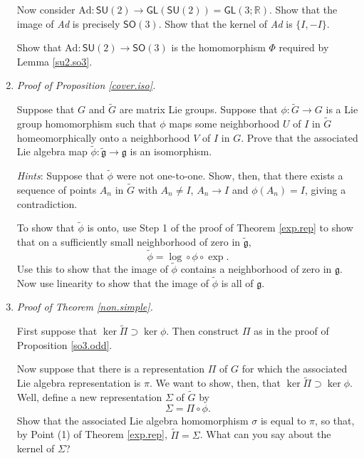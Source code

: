 \documentclass[12pt]{amsbook}
\let \frak = \mathfrak
\theoremstyle{plain}
\numberwithin{equation}{chapter}
\numberwithin{theorem}{chapter}
\begin{document}
\begin{enumerate}
Now consider $\mathrm{Ad}:\mathsf{SU}(2)\rightarrow\mathsf{GL}\left(
\mathsf{SU}(2)\right)  =\mathsf{GL}\left(  3;\mathbb{R}\right)  $. Show that
the image of \textit{Ad} is precisely $\mathsf{SO}(3)$. Show that the kernel
of \textit{Ad} is $\{I,-I\}$.

Show that $\mathrm{Ad}:\mathsf{SU}(2)\rightarrow\mathsf{SO}(3)$ is the
homomorphism $\Phi$ required by Lemma \ref{su2.so3}.

\item \label{prove.cover.iso}\textit{Proof of Proposition \ref{cover.iso}.}

Suppose that $G$ and $\widetilde{G}$ are matrix Lie groups. Suppose that
$\phi:\widetilde{G}\rightarrow G$ is a Lie group homomorphism such that $\phi$
maps some neighborhood $U$ of $I$ in $\widetilde{G}$ homeomorphically onto a
neighborhood $V$ of $I$ in $G$. Prove that the associated Lie algebra map
$\widetilde{\phi}:\widetilde{\frak{g}}\rightarrow\frak{g}$ is an isomorphism.

\textit{Hints}: Suppose that $\widetilde{\phi}$ were not one-to-one. Show,
then, that there exists a sequence of points $A_{n}$ in $\widetilde{G}$ with
$A_{n}\neq I$, $A_{n}\rightarrow I$ and $\phi(A_{n})=I$, giving a contradiction.

To show that $\widetilde{\phi}$ is onto, use Step 1 of the proof of Theorem
\ref{exp.rep} to show that on a sufficiently small neighborhood of zero in
$\widetilde{\frak{g}}$,
\[
\widetilde{\phi}=\log\circ\phi\circ\exp\text{.}%
\]
Use this to show that the image of $\widetilde{\phi}$ contains a neighborhood
of zero in $\frak{g}$. Now use linearity to show that the image of
$\widetilde{\phi}$ is all of $\frak{g}$.

\item \label{prove.non.simple}\textit{Proof of Theorem \ref{non.simple}.}

First suppose that $\ker\widetilde{\Pi}\supset\ker\phi$. Then construct $\Pi$
as in the proof of Proposition \ref{so3.odd}.

Now suppose that there is a representation $\Pi$ of $G$ for which the
associated Lie algebra representation is $\pi$. We want to show, then, that
$\ker\widetilde{\Pi}\supset\ker\phi$. Well, define a new representation
$\Sigma$ of $\widetilde{G}$ by
\[
\Sigma=\Pi\circ\phi\text{.}%
\]
Show that the associated Lie algebra homomorphism $\sigma$ is equal to $\pi$,
so that, by Point (1) of Theorem \ref{exp.rep}, $\widetilde{\Pi}=\Sigma$. What
can you say about the kernel of $\Sigma$?


\end{enumerate}
\end{document}
